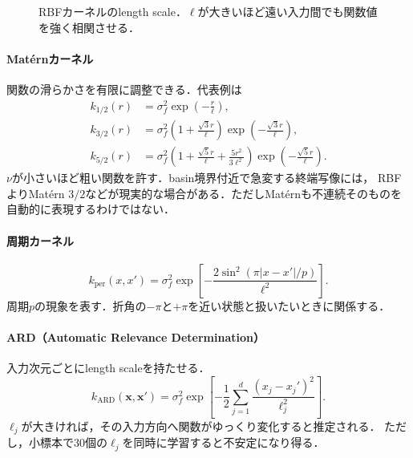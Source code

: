 \documentclass[a4paper,11pt]{ltjsarticle}
\begin{document}
\begin{figure}[H]
\centering
{}
\caption{RBFカーネルのlength scale．\(\ell\)が大きいほど遠い入力間でも関数値を強く相関させる．}
\label{fig:rbf-lengthscale}
\end{figure}

\paragraph{Mat\'{e}rnカーネル}
関数の滑らかさを有限に調整できる．代表例は
\begin{align}
  k_{1/2}(r)
  &=\sigma_f^2\exp\left(-\frac{r}{\ell}\right),\\
  k_{3/2}(r)
  &=\sigma_f^2\left(1+\frac{\sqrt3r}{\ell}\right)
  \exp\left(-\frac{\sqrt3r}{\ell}\right),
  \label{eq:matern32}\\
  k_{5/2}(r)
  &=\sigma_f^2\left(1+\frac{\sqrt5r}{\ell}
  +\frac{5r^2}{3\ell^2}\right)
  \exp\left(-\frac{\sqrt5r}{\ell}\right).
\end{align}
\(\nu\)が小さいほど粗い関数を許す．basin境界付近で急変する終端写像には，
RBFよりMat\'{e}rn \(3/2\)などが現実的な場合がある．ただしMat\'{e}rnも不連続そのものを自動的に表現するわけではない．

\paragraph{周期カーネル}
\begin{equation}
  k_{\mathrm{per}}(x,x')
  =\sigma_f^2\exp\left[
  -\frac{2\sin^2(\pi|x-x'|/p)}{\ell^2}
  \right].
  \label{eq:periodic-kernel}
\end{equation}
周期\(p\)の現象を表す．折角の\(-\pi\)と\(+\pi\)を近い状態と扱いたいときに関係する．

\paragraph{ARD（Automatic Relevance Determination）}
入力次元ごとにlength scaleを持たせる．
\begin{equation}
  k_{\mathrm{ARD}}(\bm x,\bm x')
  =\sigma_f^2\exp\left[-\frac12
  \sum_{j=1}^d\frac{(x_j-x_j')^2}{\ell_j^2}
  \right].
  \label{eq:ard-kernel}
\end{equation}
\(\ell_j\)が大きければ，その入力方向へ関数がゆっくり変化すると推定される．
ただし，小標本で30個の\(\ell_j\)を同時に学習すると不安定になり得る．
\end{document}
